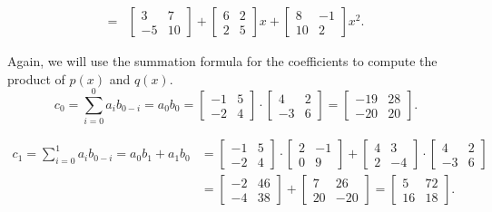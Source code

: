 \begin{align*}
=&\begin{bmatrix} 
3 & 7 \\
-5 & 10
\end{bmatrix}
+\begin{bmatrix} 
6 & 2 \\
2 & 5
\end{bmatrix}x
+\begin{bmatrix}
8 & -1\\
10 & 2\end{bmatrix}x^2.
\end{align*}

Again, we will use the summation formula for the coefficients to compute the product of $p(x)$ and $q(x)$.
\[ c_0 = \sum_{i = 0}^0 a_i b_{0 - i} = a_0b_0= \begin{bmatrix} 
-1 & 5 \\
-2 & 4
\end{bmatrix} \cdot \begin{bmatrix} 
4 & 2 \\
-3 & 6
\end{bmatrix}= \begin{bmatrix} 
-19& 28\\
-20 & 20
\end{bmatrix}. \]

\begin{align*}
 c_1 = \sum_{i = 0}^1 a_i b_{0 - i} = a_0b_1+a_1b_0&=\begin{bmatrix} 
-1 & 5 \\
-2 & 4
\end{bmatrix} \cdot \begin{bmatrix} 
2 & -1\\
0 & 9
\end{bmatrix}+ \begin{bmatrix} 
4 & 3\\
2 & -4
\end{bmatrix} \cdot\begin{bmatrix}
4 & 2\\
-3 & 6
\end{bmatrix}\\
&=\begin{bmatrix}
-2 & 46\\
-4 & 38
\end{bmatrix}+\begin{bmatrix}
7 & 26\\
20 & -20
\end{bmatrix}=\begin{bmatrix}
5 & 72\\
16 & 18
\end{bmatrix}.
\end{align*}

